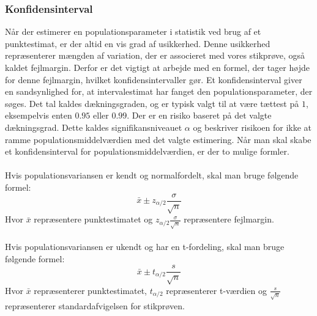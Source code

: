 \subsubsection{Konfidensinterval}
Når der estimerer en populationsparameter i statistik ved brug af et punktestimat, er der altid en vis grad af usikkerhed. Denne usikkerhed repræsenterer mængden af variation, der er associeret med vores stikprøve, også kaldet fejlmargin. Derfor er det vigtigt at arbejde med en formel, der tager højde for denne fejlmargin, hvilket konfidensintervaller gør.
Et konfidensinterval giver en sandsynlighed for, at intervalestimat har fanget den populationsparameter, der søges. Det tal kaldes dækningsgraden, og er typisk valgt til at være tættest på $1$, eksempelvis enten $0.95$ eller $0.99$. Der er en risiko baseret på det valgte dækningsgrad. Dette kaldes signifikansniveauet $\alpha$ og beskriver risikoen for ikke at ramme populationsmiddelværdien med det valgte estimering.
Når man skal skabe et konfidensinterval for populationsmiddelværdien, er der to mulige formler.
\\
\\
Hvis populationsvariansen er kendt og normalfordelt, skal man bruge følgende formel:
\\
\[\bar{x} \pm z_{\alpha/2}\frac{\sigma}{\sqrt{n}}\]
Hvor $\bar{x}$ repræsentere punktestimatet og $z_{\alpha/2}\frac{\sigma}{\sqrt{n}}$ repræsentere fejlmargin.
\\
\\
Hvis populationsvariansen er ukendt og har en t-fordeling, skal man bruge følgende formel:
\\
\[\bar{x} \pm t_{\alpha/2}\frac{s}{\sqrt{n}}\]
Hvor $\bar{x}$ repræsenterer punktestimatet, $t_{\alpha/2}$ repræsenterer t-værdien og $\frac{s}{\sqrt{n}}$ repræsenterer standardafvigelsen for stikprøven.




